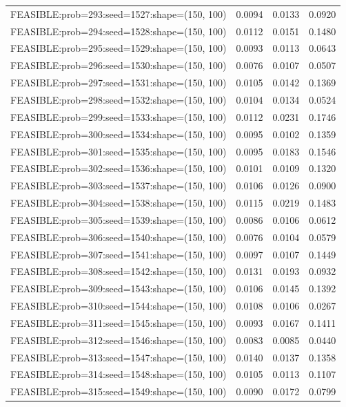 \begin{longtable}{lccc}
FEASIBLE:prob=293:seed=1527:shape=(150, 100) & 0.0094 & 0.0133 & 0.0920 \\
FEASIBLE:prob=294:seed=1528:shape=(150, 100) & 0.0112 & 0.0151 & 0.1480 \\
FEASIBLE:prob=295:seed=1529:shape=(150, 100) & 0.0093 & 0.0113 & 0.0643 \\
FEASIBLE:prob=296:seed=1530:shape=(150, 100) & 0.0076 & 0.0107 & 0.0507 \\
FEASIBLE:prob=297:seed=1531:shape=(150, 100) & 0.0105 & 0.0142 & 0.1369 \\
FEASIBLE:prob=298:seed=1532:shape=(150, 100) & 0.0104 & 0.0134 & 0.0524 \\
FEASIBLE:prob=299:seed=1533:shape=(150, 100) & 0.0112 & 0.0231 & 0.1746 \\
FEASIBLE:prob=300:seed=1534:shape=(150, 100) & 0.0095 & 0.0102 & 0.1359 \\
FEASIBLE:prob=301:seed=1535:shape=(150, 100) & 0.0095 & 0.0183 & 0.1546 \\
FEASIBLE:prob=302:seed=1536:shape=(150, 100) & 0.0101 & 0.0109 & 0.1320 \\
FEASIBLE:prob=303:seed=1537:shape=(150, 100) & 0.0106 & 0.0126 & 0.0900 \\
FEASIBLE:prob=304:seed=1538:shape=(150, 100) & 0.0115 & 0.0219 & 0.1483 \\
FEASIBLE:prob=305:seed=1539:shape=(150, 100) & 0.0086 & 0.0106 & 0.0612 \\
FEASIBLE:prob=306:seed=1540:shape=(150, 100) & 0.0076 & 0.0104 & 0.0579 \\
FEASIBLE:prob=307:seed=1541:shape=(150, 100) & 0.0097 & 0.0107 & 0.1449 \\
FEASIBLE:prob=308:seed=1542:shape=(150, 100) & 0.0131 & 0.0193 & 0.0932 \\
FEASIBLE:prob=309:seed=1543:shape=(150, 100) & 0.0106 & 0.0145 & 0.1392 \\
FEASIBLE:prob=310:seed=1544:shape=(150, 100) & 0.0108 & 0.0106 & 0.0267 \\
FEASIBLE:prob=311:seed=1545:shape=(150, 100) & 0.0093 & 0.0167 & 0.1411 \\
FEASIBLE:prob=312:seed=1546:shape=(150, 100) & 0.0083 & 0.0085 & 0.0440 \\
FEASIBLE:prob=313:seed=1547:shape=(150, 100) & 0.0140 & 0.0137 & 0.1358 \\
FEASIBLE:prob=314:seed=1548:shape=(150, 100) & 0.0105 & 0.0113 & 0.1107 \\
FEASIBLE:prob=315:seed=1549:shape=(150, 100) & 0.0090 & 0.0172 & 0.0799 \\

\end{longtable}

